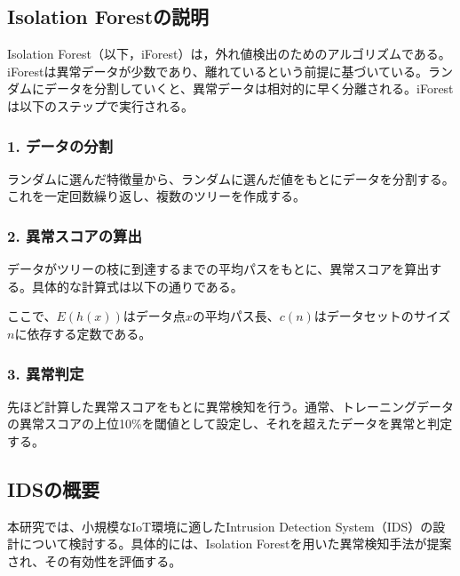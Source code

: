 \documentclass{css}
\begin{document}
\subsection{Isolation Forestの説明}
Isolation Forest（以下，iForest）は，外れ値検出のためのアルゴリズムである。iForestは異常データが少数であり、離れているという前提に基づいている。ランダムにデータを分割していくと、異常データは相対的に早く分離される。iForestは以下のステップで実行される。

\subsubsection*{1. データの分割}
ランダムに選んだ特徴量から、ランダムに選んだ値をもとにデータを分割する。これを一定回数繰り返し、複数のツリーを作成する。

\subsubsection*{2. 異常スコアの算出}
データがツリーの枝に到達するまでの平均パスをもとに、異常スコアを算出する。具体的な計算式は以下の通りである。

ここで、$E(h(x))$はデータ点$x$の平均パス長、$c(n)$はデータセットのサイズ$n$に依存する定数である。

\subsubsection*{3. 異常判定}
先ほど計算した異常スコアをもとに異常検知を行う。通常、トレーニングデータの異常スコアの上位10\%を閾値として設定し、それを超えたデータを異常と判定する。


\subsection{IDSの概要}
本研究では、小規模なIoT環境に適したIntrusion Detection System（IDS）の設計について検討する。具体的には、Isolation Forestを用いた異常検知手法が提案され、その有効性を評価する。
\end{document}
